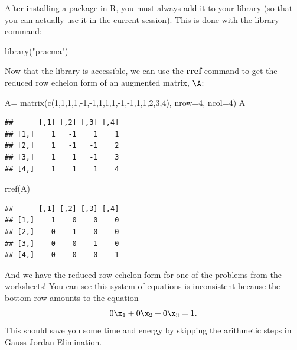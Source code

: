 \documentclass[
]{article}
\newenvironment{Shaded}{\begin{snugshade}}{\end{snugshade}}
\newcommand{\AttributeTok}[1]{\textcolor[rgb]{0.77,0.63,0.00}{#1}}
\newcommand{\DecValTok}[1]{\textcolor[rgb]{0.00,0.00,0.81}{#1}}
\newcommand{\FunctionTok}[1]{\textcolor[rgb]{0.00,0.00,0.00}{#1}}
\newcommand{\NormalTok}[1]{#1}
\newcommand{\OtherTok}[1]{\textcolor[rgb]{0.56,0.35,0.01}{#1}}
\newcommand{\SpecialCharTok}[1]{\textcolor[rgb]{0.00,0.00,0.00}{#1}}
\newcommand{\StringTok}[1]{\textcolor[rgb]{0.31,0.60,0.02}{#1}}
\theoremstyle{definition}
\theoremstyle{definition}
\theoremstyle{definition}
\theoremstyle{definition}
\theoremstyle{remark}
\begin{document}
After installing a package in R, you must always add it to your library (so that you can actually use it in the current session). This is done with the library command:

\begin{Shaded}
\begin{Highlighting}[]
\FunctionTok{library}\NormalTok{(}\StringTok{"pracma"}\NormalTok{)}
\end{Highlighting}
\end{Shaded}

Now that the library is accessible, we can use the \textbf{rref} command to get the reduced row echelon form of an augmented matrix, \(\A\):

\begin{Shaded}
\begin{Highlighting}[]
\NormalTok{A}\OtherTok{=} \FunctionTok{matrix}\NormalTok{(}\FunctionTok{c}\NormalTok{(}\DecValTok{1}\NormalTok{,}\DecValTok{1}\NormalTok{,}\DecValTok{1}\NormalTok{,}\DecValTok{1}\NormalTok{,}\SpecialCharTok{{-}}\DecValTok{1}\NormalTok{,}\SpecialCharTok{{-}}\DecValTok{1}\NormalTok{,}\DecValTok{1}\NormalTok{,}\DecValTok{1}\NormalTok{,}\DecValTok{1}\NormalTok{,}\SpecialCharTok{{-}}\DecValTok{1}\NormalTok{,}\SpecialCharTok{{-}}\DecValTok{1}\NormalTok{,}\DecValTok{1}\NormalTok{,}\DecValTok{1}\NormalTok{,}\DecValTok{2}\NormalTok{,}\DecValTok{3}\NormalTok{,}\DecValTok{4}\NormalTok{), }\AttributeTok{nrow=}\DecValTok{4}\NormalTok{, }\AttributeTok{ncol=}\DecValTok{4}\NormalTok{)}
\NormalTok{A}
\end{Highlighting}
\end{Shaded}

\begin{verbatim}
##      [,1] [,2] [,3] [,4]
## [1,]    1   -1    1    1
## [2,]    1   -1   -1    2
## [3,]    1    1   -1    3
## [4,]    1    1    1    4
\end{verbatim}

\begin{Shaded}
\begin{Highlighting}[]
\FunctionTok{rref}\NormalTok{(A)}
\end{Highlighting}
\end{Shaded}

\begin{verbatim}
##      [,1] [,2] [,3] [,4]
## [1,]    1    0    0    0
## [2,]    0    1    0    0
## [3,]    0    0    1    0
## [4,]    0    0    0    1
\end{verbatim}

And we have the reduced row echelon form for one of the problems from the worksheets! You can see this system of equations is inconsistent because the bottom row amounts to the equation
\[0\x_1+0\x_2+0\x_3 = 1.\]
This should save you some time and energy by skipping the arithmetic steps in Gauss-Jordan Elimination.
\end{document}
